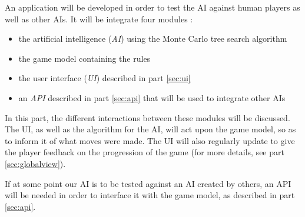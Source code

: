 An application will be developed in order to test the AI against human players as well as other AIs.
It will be integrate four modules : 
\begin{itemize}
\item the artificial intelligence (\emph{AI}) using the Monte Carlo tree search algorithm
\item the game model containing the rules
\item the user interface (\emph{UI}) described in part \ref{sec:ui}
\item an \emph{API} described in part \ref{sec:api} that will be used to integrate other AIs
\end{itemize}

In this part, the different interactions between these modules will be discussed.
The UI, as well as the algorithm for the AI, will act upon the game model, so as to inform it of what moves were made.
The UI will also regularly update to give the player feedback on the progression of the game (for more details, see part \ref{sec:globalview}).

If at some point our AI is to be tested against an AI created by others, an API will be needed in order to interface it with the game model, as described in part \ref{sec:api}.

